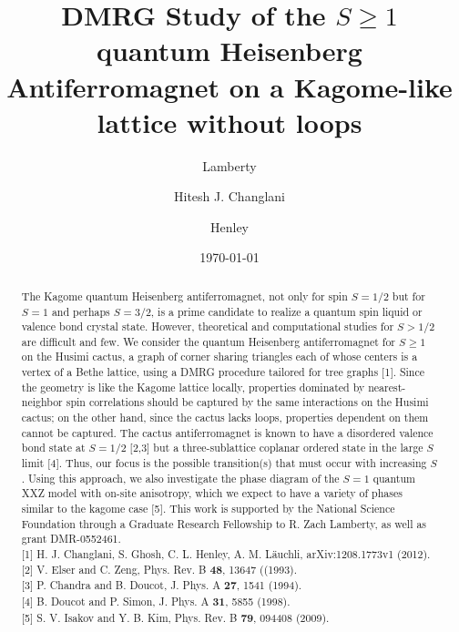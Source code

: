 \documentclass[aps]{revtex4-1}
\begin{document}
\title{DMRG Study of the $S\ge 1$ quantum Heisenberg Antiferromagnet on a Kagome-like lattice without loops}
\date{\today}

\author{ Lamberty}
\author{Hitesh J. Changlani}
\author{ Henley}

\begin{abstract}
The Kagome quantum Heisenberg antiferromagnet, not only for spin $S=1/2$ but for $S=1$ and perhaps $S=3/2$, is a prime candidate to realize a quantum spin liquid or valence bond crystal state. However, theoretical and computational studies for $S>1/2$ are difficult and few. We consider the quantum Heisenberg antiferromagnet for $S\ge1$ on the Husimi cactus, a graph of corner sharing triangles each of whose centers is a vertex of a Bethe lattice, using a DMRG procedure tailored for tree graphs $[$1$]$. Since the geometry is like the Kagome lattice locally, properties dominated by nearest-neighbor spin correlations should be captured by the same interactions on the Husimi cactus; on the other hand, since the cactus lacks loops, properties dependent on them cannot be captured. The cactus antiferromagnet is known to have a disordered valence bond state at $S=1/2$ $[$2,3$]$ but a three-sublattice coplanar ordered state in the large $S$ limit $[$4$]$. Thus, our focus is the possible transition(s) that must occur with increasing $S$.  Using this approach, we also investigate the phase diagram of the $S=1$ quantum XXZ model with on-site anisotropy, which we expect to have a variety of phases similar to the kagome case $[$5$]$.  This work is supported by the National Science Foundation through a Graduate Research Fellowship to R. Zach Lamberty, as well as grant DMR-0552461.\\
\noindent
$[$1$]$ H. J. Changlani, S. Ghosh, C. L. Henley, A. M. L\"{a}uchli, arXiv:1208.1773v1 (2012).\\
$[$2$]$ V. Elser and C. Zeng, Phys. Rev. B \textbf{48}, 13647 ((1993).\\
$[$3$]$ P. Chandra and B. Doucot, J. Phys. A \textbf{27}, 1541 (1994).\\
$[$4$]$ B. Doucot and P. Simon, J. Phys. A \textbf{31}, 5855 (1998).\\
$[$5$]$ S. V. Isakov and Y. B. Kim, Phys. Rev. B \textbf{79}, 094408 (2009).

\end{abstract}
\maketitle
\end{document}
